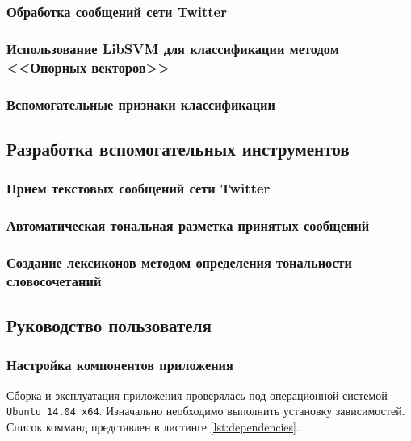        \subsubsection{Обработка сообщений сети Twitter}


        \subsubsection{Использование LibSVM для классификации методом <<Опорных векторов>>}

        \subsubsection{Вспомогательные признаки классификации}

    \subsection{Разработка вспомогательных инструментов}
        \subsubsection{Прием текстовых сообщений сети Twitter}

        \subsubsection{Автоматическая тональная разметка принятых сообщений}

        \subsubsection{Создание лексиконов методом определения тональности словосочетаний}

    \subsection{Руководство пользователя}
        \subsubsection{Настройка компонентов приложения}
        Сборка и эксплуатация приложения проверялась под операционной системой
        {\tt Ubuntu 14.04 x64}. Изначально необходимо выполнить установку зависимостей.
        Список комманд представлен в листинге \ref{lst:dependencies}.
        \lstset{style=bash}
        


